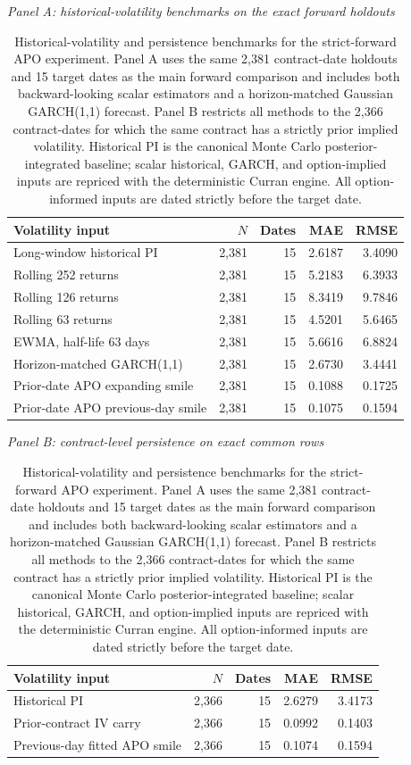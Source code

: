 \begin{table}[t]
\centering
\caption{Historical-volatility and persistence benchmarks for the strict-forward APO experiment. Panel A uses the same 2,381 contract-date holdouts and 15 target dates as the main forward comparison and includes both backward-looking scalar estimators and a horizon-matched Gaussian GARCH(1,1) forecast. Panel B restricts all methods to the 2,366 contract-dates for which the same contract has a strictly prior implied volatility. Historical PI is the canonical Monte Carlo posterior-integrated baseline; scalar historical, GARCH, and option-implied inputs are repriced with the deterministic Curran engine. All option-informed inputs are dated strictly before the target date.}\label{tab:recent_history_persistence}

\textit{Panel A: historical-volatility benchmarks on the exact forward holdouts}\\[2pt]
\begin{tabular}{lrrrr}
\toprule
Volatility input & $N$ & Dates & MAE & RMSE\\
\midrule
Long-window historical PI & 2,381 & 15 & 2.6187 & 3.4090\\
Rolling 252 returns & 2,381 & 15 & 5.2183 & 6.3933\\
Rolling 126 returns & 2,381 & 15 & 8.3419 & 9.7846\\
Rolling 63 returns & 2,381 & 15 & 4.5201 & 5.6465\\
EWMA, half-life 63 days & 2,381 & 15 & 5.6616 & 6.8824\\
Horizon-matched GARCH(1,1) & 2,381 & 15 & 2.6730 & 3.4441\\
Prior-date APO expanding smile & 2,381 & 15 & 0.1088 & 0.1725\\
Prior-date APO previous-day smile & 2,381 & 15 & 0.1075 & 0.1594\\
\bottomrule
\end{tabular}

\vspace{5pt}
\textit{Panel B: contract-level persistence on exact common rows}\\[2pt]
\begin{tabular}{lrrrr}
\toprule
Volatility input & $N$ & Dates & MAE & RMSE\\
\midrule
Historical PI & 2,366 & 15 & 2.6279 & 3.4173\\
Prior-contract IV carry & 2,366 & 15 & 0.0992 & 0.1403\\
Previous-day fitted APO smile & 2,366 & 15 & 0.1074 & 0.1594\\
\bottomrule
\end{tabular}
\end{table}


